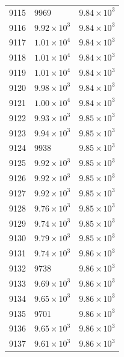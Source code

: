 \begin{table}[H]
\begin{tabular}{lll}
9115 & 9969 & $\displaystyle 9.84 \times 10^{3}$ \\
9116 & $\displaystyle 9.92 \times 10^{3}$ & $\displaystyle 9.84 \times 10^{3}$ \\
9117 & $\displaystyle 1.01 \times 10^{4}$ & $\displaystyle 9.84 \times 10^{3}$ \\
9118 & $\displaystyle 1.01 \times 10^{4}$ & $\displaystyle 9.84 \times 10^{3}$ \\
9119 & $\displaystyle 1.01 \times 10^{4}$ & $\displaystyle 9.84 \times 10^{3}$ \\
9120 & $\displaystyle 9.98 \times 10^{3}$ & $\displaystyle 9.84 \times 10^{3}$ \\
9121 & $\displaystyle 1.00 \times 10^{4}$ & $\displaystyle 9.84 \times 10^{3}$ \\
9122 & $\displaystyle 9.93 \times 10^{3}$ & $\displaystyle 9.85 \times 10^{3}$ \\
9123 & $\displaystyle 9.94 \times 10^{3}$ & $\displaystyle 9.85 \times 10^{3}$ \\
9124 & 9938 & $\displaystyle 9.85 \times 10^{3}$ \\
9125 & $\displaystyle 9.92 \times 10^{3}$ & $\displaystyle 9.85 \times 10^{3}$ \\
9126 & $\displaystyle 9.92 \times 10^{3}$ & $\displaystyle 9.85 \times 10^{3}$ \\
9127 & $\displaystyle 9.92 \times 10^{3}$ & $\displaystyle 9.85 \times 10^{3}$ \\
9128 & $\displaystyle 9.76 \times 10^{3}$ & $\displaystyle 9.85 \times 10^{3}$ \\
9129 & $\displaystyle 9.74 \times 10^{3}$ & $\displaystyle 9.85 \times 10^{3}$ \\
9130 & $\displaystyle 9.79 \times 10^{3}$ & $\displaystyle 9.85 \times 10^{3}$ \\
9131 & $\displaystyle 9.74 \times 10^{3}$ & $\displaystyle 9.86 \times 10^{3}$ \\
9132 & 9738 & $\displaystyle 9.86 \times 10^{3}$ \\
9133 & $\displaystyle 9.69 \times 10^{3}$ & $\displaystyle 9.86 \times 10^{3}$ \\
9134 & $\displaystyle 9.65 \times 10^{3}$ & $\displaystyle 9.86 \times 10^{3}$ \\
9135 & 9701 & $\displaystyle 9.86 \times 10^{3}$ \\
9136 & $\displaystyle 9.65 \times 10^{3}$ & $\displaystyle 9.86 \times 10^{3}$ \\
9137 & $\displaystyle 9.61 \times 10^{3}$ & $\displaystyle 9.86 \times 10^{3}$ \\

\end{tabular}
\end{table}
